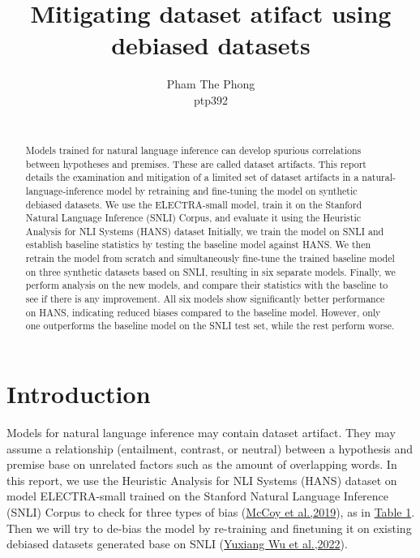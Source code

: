 \documentclass{article}
\title{Mitigating dataset atifact using debiased datasets}
\author{%
  Pham The Phong \\
  ptp392\\
   \\
}
\begin{document}
\maketitle


\begin{abstract}


 Models trained for natural language inference can develop spurious correlations between hypotheses and premises.
 These are called dataset artifacts.
  This report details the examination and mitigation of a limited set of dataset artifacts in a natural-language-inference model by retraining and fine-tuning the model on synthetic debiased datasets.
 We use the ELECTRA-small model, train it on the Stanford Natural Language Inference (SNLI) Corpus, and evaluate it using the Heuristic Analysis for NLI Systems (HANS) dataset
 Initially, we train the model on SNLI and establish baseline statistics by testing the baseline model against HANS.
  We then retrain the model from scratch and simultaneously fine-tune the trained baseline model on three synthetic datasets based on SNLI, resulting in six separate models.
  Finally, we perform analysis on the new models, and compare their statistics with the baseline to see if there is any improvement.
  All six models show significantly better performance on HANS, indicating reduced biases compared to the baseline model.
  However, only one outperforms the baseline model on the SNLI test set, while the rest perform worse.

\end{abstract}


\section{Introduction}
Models for natural language inference may contain dataset artifact.
They may assume a relationship (entailment, contrast, or neutral) between a hypothesis and premise base on unrelated factors such as the amount of overlapping words.
In this report, we use the Heuristic Analysis for NLI Systems (HANS) dataset on model ELECTRA-small trained on the Stanford Natural Language Inference (SNLI) Corpus to check for three types of bias (\hyperref[ref1]{McCoy et al.,2019}), as in \hyperref[table1]{Table 1}.
Then we will try to de-bias the model by re-training and finetuning it on existing debiased datasets generated base on SNLI (\hyperref[ref2]{Yuxiang Wu et al.,2022}).
\end{document}
